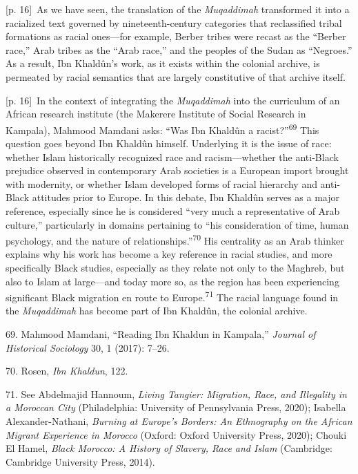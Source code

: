 \documentclass[10pt,a4paper]{article}
\begin{document}
{\scriptsize\color{gray} [p. 16]}\ As we have seen, the translation of the \textit{Muqaddimah} transformed it into a racialized text governed by nineteenth-century categories that reclassified tribal formations as racial ones—for example, Berber tribes were recast as the “Berber race,” Arab tribes as the “Arab race,” and the peoples of the Sudan as “Negroes.” As a result, Ibn Khaldûn’s work, as it exists within the colonial archive, is permeated by racial semantics that are largely constitutive of that archive itself.\par
{\scriptsize\color{gray} [p. 16]}\ In the context of integrating the \textit{Muqaddimah} into the curriculum of an African research institute (the Makerere Institute of Social Research in Kampala), Mahmood Mamdani asks: “Was Ibn Khaldûn a racist?”\nobreak\textsuperscript{69} This question goes beyond Ibn Khaldûn himself. Underlying it is the issue of race: whether Islam historically recognized race and racism—whether the anti-Black prejudice observed in contemporary Arab societies is a European import brought with modernity, or whether Islam developed forms of racial hierarchy and anti-Black attitudes prior to Europe. In this debate, Ibn Khaldûn serves as a major reference, especially since he is considered “very much a representative of Arab culture,” particularly in domains pertaining to “his consideration of time, human psychology, and the nature of relationships.”\nobreak\textsuperscript{70} His centrality as an Arab thinker explains why his work has become a key reference in racial studies, and more specifically Black studies, especially as they relate not only to the Maghreb, but also to Islam at large—and today more so, as the region has been experiencing significant Black migration en route to Europe.\nobreak\textsuperscript{71} The racial language found in the \textit{Muqaddimah} has become part of Ibn Khaldûn, the colonial archive.\par{\small 69. Mahmood Mamdani, “Reading Ibn Khaldun in Kampala,” \textit{Journal of Historical Sociology} 30, 1 (2017): 7–26.\par}{\small 70. Rosen, \textit{Ibn Khaldun}, 122.\par}{\small 71. See Abdelmajid Hannoum, \textit{Living Tangier: Migration, Race, and Illegality in a Moroccan City} (Philadelphia: University of Pennsylvania Press, 2020); Isabella Alexander-Nathani, \textit{Burning at Europe’s Borders: An Ethnography on the African Migrant Experience in Morocco} (Oxford: Oxford University Press, 2020); Chouki El Hamel, \textit{Black Morocco: A History of Slavery, Race and Islam} (Cambridge: Cambridge University Press, 2014).\par}
\end{document}
